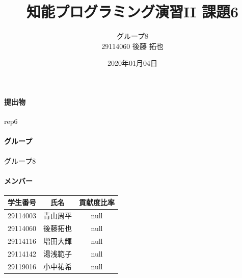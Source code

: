 \documentclass[uplatex,12pt]{jsarticle}
\title{知能プログラミング演習II 課題6}
\author{グループ8\\
  29114060 後藤 拓也\\
}
\date{2020年01月04日}
\begin{document}
\maketitle

\paragraph{提出物} rep6
\paragraph{グループ} グループ8

\paragraph{メンバー}
\begin{tabular}{|c|c|c|}
  \hline
  学生番号&氏名&貢献度比率\\
  \hline\hline
  29114003&青山周平&null\\
  \hline
  29114060&後藤拓也&null\\
  \hline
  29114116&増田大輝&null\\
  \hline
  29114142&湯浅範子&null\\
  \hline
  29119016&小中祐希&null\\
  \hline
\end{tabular}
\end{document}
